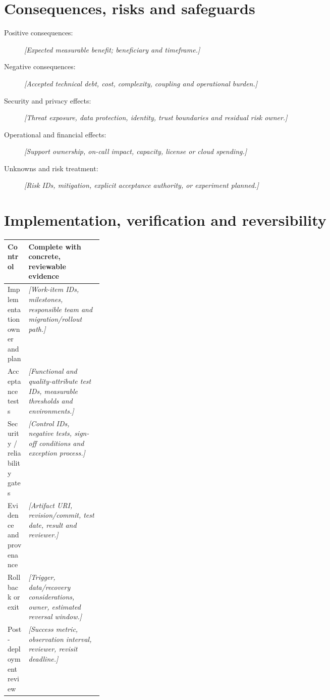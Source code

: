 \documentclass[11pt,letterpaper]{article}
\begin{document}
\section{Consequences, risks and safeguards}
\begin{description}
\item[Positive consequences:] \emph{[Expected measurable benefit; beneficiary and timeframe.]}
\item[Negative consequences:] \emph{[Accepted technical debt, cost, complexity, coupling and operational burden.]}
\item[Security and privacy effects:] \emph{[Threat exposure, data protection, identity, trust boundaries and residual risk owner.]}
\item[Operational and financial effects:] \emph{[Support ownership, on-call impact, capacity, license or cloud spending.]}
\item[Unknowns and risk treatment:] \emph{[Risk IDs, mitigation, explicit acceptance authority, or experiment planned.]}
\end{description}

\section{Implementation, verification and reversibility}
\par\noindent\begin{tabularx}{\linewidth}{@{}>{\raggedright\arraybackslash}p{0.22\linewidth}>{\raggedright\arraybackslash}X@{}}
\toprule
\textbf{Control} & \textbf{Complete with concrete, reviewable evidence}\\
\midrule
Implementation owner and plan & \emph{[Work-item IDs, milestones, responsible team and migration/rollout path.]}\\
Acceptance tests & \emph{[Functional and quality-attribute test IDs, measurable thresholds and environments.]}\\
Security / reliability gates & \emph{[Control IDs, negative tests, sign-off conditions and exception process.]}\\
Evidence and provenance & \emph{[Artifact URI, revision/commit, test date, result and reviewer.]}\\
Rollback or exit & \emph{[Trigger, data/recovery considerations, owner, estimated reversal window.]}\\
Post-deployment review & \emph{[Success metric, observation interval, reviewer, revisit deadline.]}\\
\bottomrule
\end{tabularx}\par
\end{document}
